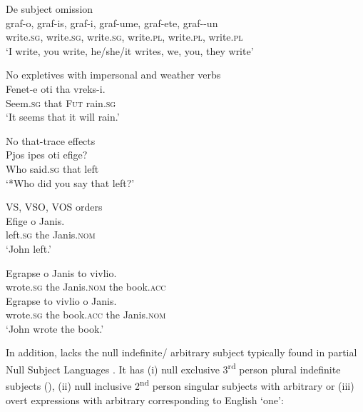 \documentclass[output=paper]{LSP/langsci}
\begin{document}
\ea \label{ex:anagnost:9}
De subject omission  \\
\gll graf-o, graf-is, graf-i, graf-ume, graf-ete, graf-{}-un\\
write.\textsc{sg}, write.\textsc{sg}, write.\textsc{sg}, write.\textsc{pl}, write.\textsc{pl}, write.\textsc{pl}\\
\glt 
  ‘I write, you write, he/she/it writes, we, you, they write’
\z


\ea \label{ex:anagnost:10}
No expletives with impersonal and weather verbs  \\
\gll Fenet-e oti tha vreks-i.\\
Seem.\textsc{sg} that \textsc{Fut} rain.\textsc{sg}\\
\glt 
‘It seems that it will rain.’
\z


\ea \label{ex:anagnost:11}
No that-trace effects \\
\gll Pjos ipes oti efige? \\
  Who said.\textsc{sg} that left\\
\glt 
  ‘*Who did you say that left?’
\z


\ea \label{ex:anagnost:12}
 VS, VSO, VOS orders  \\
\ea\label{ex:anagnost:12a}
\gll Efige o Janis.\\
  left.\textsc{sg} the Janis.\textsc{nom}\\
\glt 
  ‘John left.’


\ex
\gll  Egrapse o Janis to vivlio.\\
  wrote.\textsc{sg} the Janis.\textsc{nom} the book.\textsc{acc}\\


\ex
 \gll Egrapse to vivlio o Janis.\\
  wrote.\textsc{sg} the book.\textsc{acc} the Janis.\textsc{nom}\\

\glt 
  ‘John wrote the book.’
\z
\z

In addition,  lacks the null indefinite/ arbitrary subject typically found in partial Null Subject Languages \citep{Holmberg2010Null}. It has (i) null exclusive 3\textsuperscript{rd} person plural indefinite subjects (\citealt{BellettiRizzi1988,Pesetsky1995,Condoravdi1989}), (ii) null inclusive 2\textsuperscript{nd} person singular subjects with arbitrary  or (iii) overt expressions with arbitrary  corresponding to English ‘one’:
\end{document}
